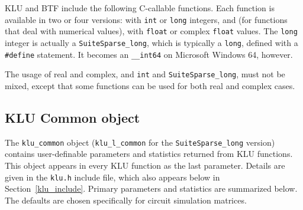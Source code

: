 \documentclass[11pt]{article}
\begin{document}
KLU and BTF include the following C-callable functions.  Each function is
available in two or four versions: with {\tt int} or {\tt long} integers, and
(for functions that deal with numerical values), with {\tt float} or complex
{\tt float} values.  The {\tt long} integer is actually a {\tt SuiteSparse\_long},
which is typically a {\tt long}, defined with a {\tt \#define} statement.  It
becomes an {\tt \_\_int64} on Microsoft Windows 64, however.

The usage of real and complex, and {\tt int} and {\tt SuiteSparse\_long}, must not be
mixed, except that some functions can be used for both real and complex cases.

\subsection{KLU Common object}

The {\tt klu\_common} object ({\tt klu\_l\_common} for the {\tt SuiteSparse\_long}
version) contains user-definable parameters and statistics returned from
KLU functions.  This object appears in every KLU function as the last
parameter.  Details are given in the {\tt klu.h} include file, which also
appears below in Section~\ref{klu_include}.  Primary parameters and statistics
are summarized below.  The defaults are chosen specifically for circuit
simulation matrices.
\end{document}

